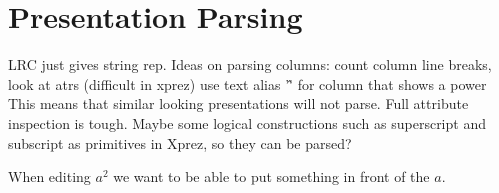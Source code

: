 \chapter{Presentation Parsing}
LRC just gives string rep.
Ideas on parsing columns:
count column line breaks, look at atrs (difficult in xprez) use text alias '\^' for column that shows a power
This means that similar looking presentations will not parse. 
Full attribute inspection is tough. Maybe some logical constructions such as superscript and subscript as primitives in Xprez, so they can be parsed?

When editing $a^2$ we want to be able to put something in front of the $a$.
